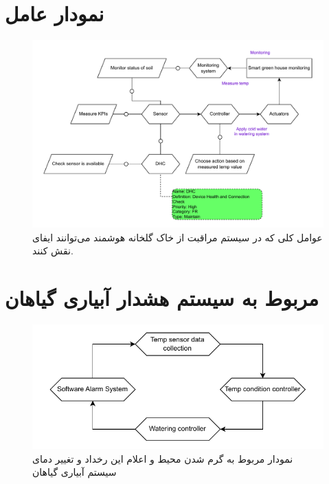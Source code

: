 \documentclass[a4paper]{report}
\begin{document}
\section*{نمودار عامل}

\begin{figure}[H]
    \centering
    \includegraphics[width=1.0\textwidth]{assets/diagrams/agent_diagram.drawio.pdf}
    \caption{عوامل کلی که در سیستم مراقبت از خاک گلخانه هوشمند می‌توانند ایفای
    نقش کنند.}
\end{figure}

\section*{ مربوط به سیستم هشدار آبیاری گیاهان}

\begin{figure}[H]
    \centering
    \includegraphics[width=1.0\textwidth]{assets/diagrams/temp_context_diagram.drawio.pdf}
    \caption{نمودار  مربوط به گرم شدن محیط و اعلام این رخداد و تغییر
    دمای سیستم آبیاری گیاهان}
\end{figure}

\section*{}
\end{document}
